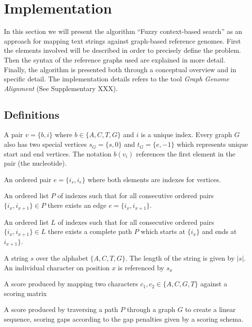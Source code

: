 \documentclass{article}
\begin{document}
\chapter{Implementation}
In this section we will present the algorithm ``Fuzzy context-based search'' as an approach for mapping text strings against graph-based reference genomes. First the elements involved will be described in order to precisely define the problem. Then the syntax of the reference graphs used are explained in more detail. Finally, the algorithm is presented both through a conceptual overview and in specific detail. The implementation details refers to the tool \textit{Graph Genome Alignment} (See Supplementary XXX).
\section{Definitions}
\begin{defn}[Vertice]
  A pair $v=\{b, i\}$ where $b \in \{A, C, T, G\}$ and $i$ is a unique index. Every graph $G$ also has two special vertices $s_G=\{s, 0\}$ and $t_G=\{e, -1\}$ which represents unique start and end vertices. The notation $b(v_i)$ references the first element in the pair (the nucleotide).
\end{defn}
\begin{defn}[Edge]
  An ordered pair $e=\{i_s, i_e\}$ where both elements are indexes for vertices. 
\end{defn}
\begin{defn}
  An ordered list $P$ of indexes such that for all consecutive ordered pairs $\{i_x, i_{x+1}\} \in P$ there exists an edge $e=\{i_x, i_{x+1}\}$.
\end{defn}
\begin{defn}[Path]
  An ordered list $L$ of indexes such that for all consecutive ordered pairs $\{i_x, i_{x+1}\} \in L$ there exists a complete path $P$ which starts at $\{i_x\}$ and ends at $i_{x+1}\}$.
\end{defn}
\begin{defn}
  A string $s$ over the alphabet $\{A, C, T, G\}$. The length of the string is given by $|s|$. An individual character on position $x$ is referenced by $s_x$
\end{defn}
\begin{defn}
  A score produced by mapping two characters $c_1, c_2 \in \{A, C, G, T\}$ against a scoring matrix
\end{defn}
\begin{defn}
  A score produced by traversing a path $P$ through a graph $G$ to create a linear sequence, scoring gaps according to the gap penalties given by a scoring schema.
\end{defn}
\end{document}
